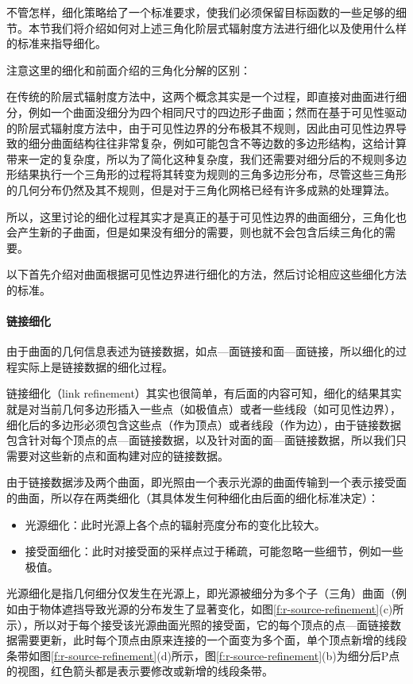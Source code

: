 不管怎样，细化策略给了一个标准要求，使我们必须保留目标函数的一些足够的细节。本节我们将介绍如何对上述三角化阶层式辐射度方法进行细化以及使用什么样的标准来指导细化。

\begin{myshaded}
	注意这里的细化和前面介绍的三角化分解的区别：
	
	在传统的阶层式辐射度方法中，这两个概念其实是一个过程，即直接对曲面进行细分，例如一个曲面没细分为四个相同尺寸的四边形子曲面；然而在基于可见性驱动的阶层式辐射度方法中，由于可见性边界的分布极其不规则，因此由可见性边界导致的细分曲面结构往往非常复杂，例如可能包含不等边数的多边形结构，这给计算带来一定的复杂度，所以为了简化这种复杂度，我们还需要对细分后的不规则多边形结果执行一个三角形的过程将其转变为规则的三角多边形分布，尽管这些三角形的几何分布仍然及其不规则，但是对于三角化网格已经有许多成熟的处理算法。
	
	所以，这里讨论的细化过程其实才是真正的基于可见性边界的曲面细分，三角化也会产生新的子曲面，但是如果没有细分的需要，则也就不会包含后续三角化的需要。
\end{myshaded}

以下首先介绍对曲面根据可见性边界进行细化的方法，然后讨论相应这些细化方法的标准。




\paragraph{链接细化}
由于曲面的几何信息表述为链接数据，如点—面链接和面—面链接，所以细化的过程实际上是链接数据的细化过程。

链接细化（link refinement）其实也很简单，有后面的内容可知，细化的结果其实就是对当前几何多边形插入一些点（如极值点）或者一些线段（如可见性边界），细化后的多边形必须包含这些点（作为顶点）或者线段（作为边），由于链接数据包含针对每个顶点的点—面链接数据，以及针对面的面—面链接数据，所以我们只需要对这些新的点和面构建对应的链接数据。

由于链接数据涉及两个曲面，即光照由一个表示光源的曲面传输到一个表示接受面的曲面，所以存在两类细化（其具体发生何种细化由后面的细化标准决定）：

\begin{itemize}
	\item 光源细化：此时光源上各个点的辐射亮度分布的变化比较大。
	\item 接受面细化：此时对接受面的采样点过于稀疏，可能忽略一些细节，例如一些极值。
\end{itemize}

光源细化是指几何细分仅发生在光源上，即光源被细分为多个子（三角）曲面（例如由于物体遮挡导致光源的分布发生了显著变化，如图\ref{f:r-source-refinement}(c)所示），所以对于每个接受该光源曲面光照的接受面，它的每个顶点的点—面链接数据需要更新，此时每个顶点由原来连接的一个面变为多个面，单个顶点新增的线段条带如图\ref{f:r-source-refinement}(d)所示，图\ref{f:r-source-refinement}(b)为细分后P点的视图，红色箭头都是表示要修改或新增的线段条带。


